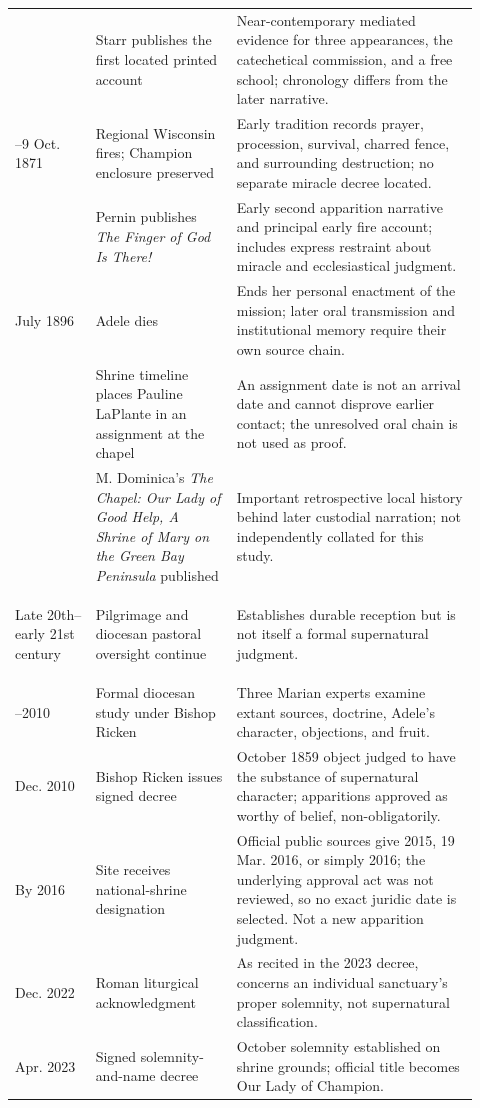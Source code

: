 \begin{longtable}{>{\bfseries\raggedright\arraybackslash}p{0.16\linewidth}>{\raggedright\arraybackslash}p{0.28\linewidth}>{\raggedright\arraybackslash}p{0.48\linewidth}}
1871 & Starr publishes the first located printed account & Near-contemporary mediated evidence for three appearances, the catechetical commission, and a free school; chronology differs from the later narrative.\\
8--9 Oct. 1871 & Regional Wisconsin fires; Champion enclosure preserved & Early tradition records prayer, procession, survival, charred fence, and surrounding destruction; no separate miracle decree located.\\
1874 & Pernin publishes \emph{The Finger of God Is There!} & Early second apparition narrative and principal early fire account; includes express restraint about miracle and ecclesiastical judgment.\\
5 July 1896 & Adele dies & Ends her personal enactment of the mission; later oral transmission and institutional memory require their own source chain.\\
1902 & Shrine timeline places Pauline LaPlante in an assignment at the chapel & An assignment date is not an arrival date and cannot disprove earlier contact; the unresolved oral chain is not used as proof.\\
1955 & M. Dominica's \emph{The Chapel: Our Lady of Good Help, A Shrine of Mary on the Green Bay Peninsula} published & Important retrospective local history behind later custodial narration; not independently collated for this study.\\
Late 20th--early 21st century & Pilgrimage and diocesan pastoral oversight continue & Establishes durable reception but is not itself a formal supernatural judgment.\\
2009--2010 & Formal diocesan study under Bishop Ricken & Three Marian experts examine extant sources, doctrine, Adele's character, objections, and fruit.\\
8 Dec. 2010 & Bishop Ricken issues signed decree & October 1859 object judged to have the substance of supernatural character; apparitions approved as worthy of belief, non-obligatorily.\\
By 2016 & Site receives national-shrine designation & Official public sources give 2015, 19 Mar. 2016, or simply 2016; the underlying approval act was not reviewed, so no exact juridic date is selected. Not a new apparition judgment.\\
15 Dec. 2022 & Roman liturgical acknowledgment & As recited in the 2023 decree, concerns an individual sanctuary's proper solemnity, not supernatural classification.\\
20 Apr. 2023 & Signed solemnity-and-name decree & 9 October solemnity established on shrine grounds; official title becomes Our Lady of Champion.\\

\end{longtable}
